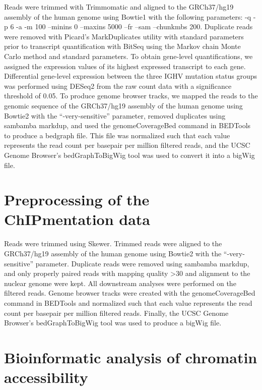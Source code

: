 \documentclass[10pt,]{article}
\begin{document}
Reads were trimmed with Trimmomatic\citep{Bolger2014} and aligned to the
GRCh37/hg19 assembly of the human genome using
Bowtie1\citep{Langmead2009} with the following parameters: -q -p 6 -a -m
100 --minins 0 --maxins 5000 --fr --sam --chunkmbs 200. Duplicate reads
were removed with Picard's MarkDuplicates utility with standard
parameters prior to transcript quantification with
BitSeq\citep{Hensman2015} using the Markov chain Monte Carlo method and
standard parameters. To obtain gene-level quantifications, we assigned
the expression values of its highest expressed transcript to each gene.
Differential gene-level expression between the three IGHV mutation
status groups was performed using DESeq2\citep{Love2014} from the raw
count data with a significance threshold of 0.05. To produce genome
browser tracks, we mapped the reads to the genomic sequence of the
GRCh37/hg19 assembly of the human genome using
Bowtie2\citep{Langmead2012} with the ``-very-sensitive'' parameter,
removed duplicates using sambamba markdup\citep{Tarasov2015}, and used
the genomeCoverageBed command in BEDTools\citep{Quinlan2010} to produce
a bedgraph file. This file was normalized such that each value
represents the read count per basepair per million filtered reads, and
the UCSC Genome Browser's bedGraphToBigWig tool was used to convert it
into a bigWig file.

\section{Preprocessing of the ChIPmentation
data}\label{preprocessing-of-the-chipmentation-data}

Reads were trimmed using Skewer\citep{Jiang2014}. Trimmed reads were
aligned to the GRCh37/hg19 assembly of the human genome using
Bowtie2\citep{Langmead2012} with the ``-very-sensitive'' parameter.
Duplicate reads were removed using sambamba markdup\citep{Tarasov2015},
and only properly paired reads with mapping quality \textgreater{}30 and
alignment to the nuclear genome were kept. All downstream analyses were
performed on the filtered reads. Genome browser tracks were created with
the genomeCoverageBed command in BEDTools\citep{Quinlan2010} and
normalized such that each value represents the read count per basepair
per million filtered reads. Finally, the UCSC Genome Browser's
bedGraphToBigWig tool was used to produce a bigWig file.

\section{Bioinformatic analysis of chromatin
accessibility}\label{bioinformatic-analysis-of-chromatin-accessibility}
\end{document}
